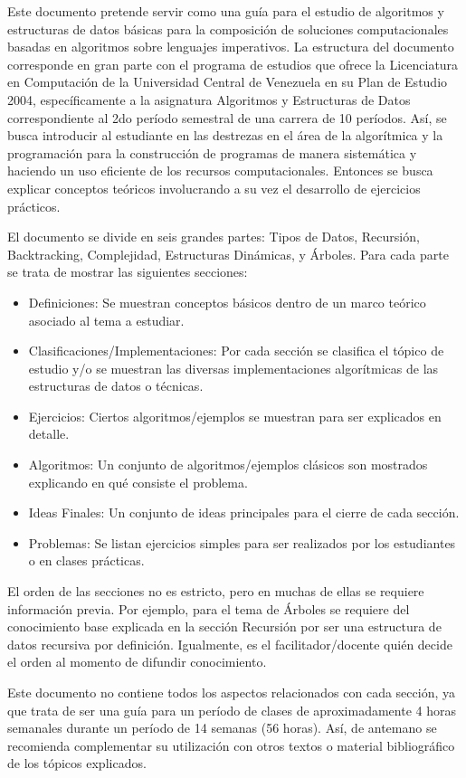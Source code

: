 
Este documento pretende servir como una guía para el estudio de algoritmos y estructuras de datos básicas para la composición de soluciones computacionales basadas en algoritmos sobre lenguajes imperativos. La estructura del documento corresponde en gran parte con el programa de estudios que ofrece la Licenciatura en Computación de la Universidad Central de Venezuela en su Plan de Estudio 2004, específicamente a la asignatura Algoritmos y Estructuras de Datos correspondiente al 2do período semestral de una carrera de 10 períodos. Así, se busca introducir al estudiante en las destrezas en el área de la algorítmica y la programación para la construcción de programas de manera sistemática y haciendo un uso eficiente de los recursos computacionales. Entonces se busca explicar conceptos teóricos involucrando a su vez el desarrollo de ejercicios prácticos.

El documento se divide en seis grandes partes: Tipos de Datos, Recursión, Backtracking, Complejidad, Estructuras Dinámicas, y Árboles. Para cada parte se trata de mostrar las siguientes secciones:
\begin{itemize}
\item Definiciones: Se muestran conceptos básicos dentro de un marco teórico asociado al tema a estudiar.
\item Clasificaciones/Implementaciones: Por cada sección se clasifica el tópico de estudio y/o se muestran las diversas implementaciones algorítmicas de las estructuras de datos o técnicas.
\item Ejercicios: Ciertos algoritmos/ejemplos se muestran para ser explicados en detalle.
\item Algoritmos: Un conjunto de algoritmos/ejemplos clásicos son mostrados explicando en qué consiste el problema.
\item Ideas Finales: Un conjunto de ideas principales para el cierre de cada sección.
\item Problemas: Se listan ejercicios simples para ser realizados por los estudiantes o en clases prácticas.
\end{itemize}

El orden de las secciones no es estricto, pero en muchas de ellas se requiere información previa. Por ejemplo, para el tema de Árboles se requiere del conocimiento base explicada en la sección Recursión por ser una estructura de datos recursiva por definición. Igualmente, es el facilitador/docente quién decide el orden al momento de difundir conocimiento.

Este documento no contiene todos los aspectos relacionados con cada sección, ya que trata de ser una guía para un período de clases de aproximadamente 4 horas semanales durante un período de 14 semanas (56 horas). Así, de antemano se recomienda complementar su utilización con otros textos o material bibliográfico de los tópicos explicados.

